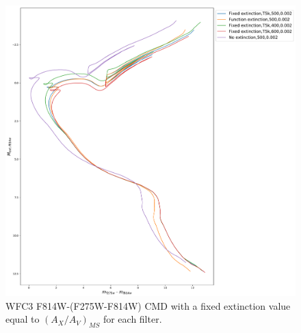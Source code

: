 \documentclass[12pt, a4paper]{report}
\begin{document}
\begin{figure}[h]
\begin{center}
\includegraphics[width=1.0\textwidth]{../basti_isochrones_10_13Gyr/Extinction_T5k_FeH0fix_func_f814w_f275wmf814w_500_400_600_Myr_FeH_0p002_ref_noext_Av_1p0.pdf}
\caption{WFC3 F814W-(F275W-F814W) CMD with a fixed extinction value equal to $(A_{X}/A_{V})_{MS}$ for each filter.}
\label{wfc3_isoc2_T5k}
\end{center}
\end{figure}
\end{document}
